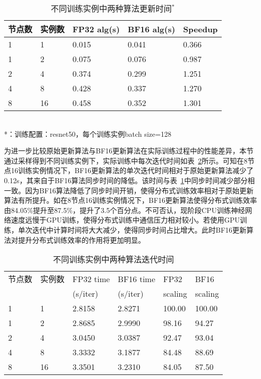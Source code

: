 \begin{table}[htbp]
  \centering
  \caption{不同训练实例中两种算法更新时间$^{*}$}
  \label{tab:fp32_bf16_real_update_time}
  \begin{minipage}[t]{0.8\textwidth} 
    \begin{tabularx}{\linewidth}{|l|X|X|X|X|}
      \hline
      节点数 & 实例数 & FP32 alg(s) & BF16 alg(s) & Speedup\\
      \hline
1 & 1 & 0.015 & 0.041 & 0.366 \\
1 & 2 & 0.075 & 0.076 & 0.987 \\
2 & 4 & 0.374 & 0.299 & 1.251 \\
4 & 8 & 0.428 & 0.337 & 1.270 \\
8 & 16 & 0.458 & 0.352 & 1.301 \\
      \hline
    \end{tabularx}\\[2pt]
    \footnotesize
    *：训练配置：resnet50，每个训练实例batch size=128\\
  \end{minipage}
\end{table}

为进一步比较原始更新算法与BF16更新算法在实际训练过程中的性能差异，本节通过采样得到不同训练实例下，实际训练中每次迭代时间如表~\ref{tab:fp32_bf16_real_iter_time}所示。可知在8节点16训练实例情况下，BF16更新算法的单次迭代时间相对于原始更新算法减少了0.12s，其来自于BF16算法同步时间的降低。该时间与表~\ref{tab:fp32_bf16_real_update_time}中同步时间减少部分相一致。因为BF16算法降低了同步时间开销，使得分布式训练效率相对于原始更新算法有所提升。如在8节点16训练实例情况下，BF16更新算法使得分布式训练效率由84.05\%提升至87.5\%，提升了3.5个百分点。不可否认，现阶段CPU训练神经网络速度远慢于GPU训练，使得分布式训练中通信压力相对较小。若使用GPU训练，单次迭代中计算时间将大大减少，使得同步时间占比增大。此时BF16更新算法对提升分布式训练效率的作用将更加明显。

\begin{table}[htbp]
  \centering
  \caption{不同训练实例中两种算法迭代时间}
  \label{tab:fp32_bf16_real_iter_time}
  \begin{minipage}[t]{0.8\textwidth} 
    \begin{tabularx}{\linewidth}{|l|X|X|X|X|X|}
      \hline
      节点数 & 实例数 & FP32 time & BF16 time & FP32 & BF16 \\
       &  & (s/iter) & (s/iter) & scaling & scaling\\
      \hline
1 & 1 & 2.8158 & 2.8271 & 100.00 & 100.00 \\
1 & 2 & 2.8685 & 2.9990 & 98.16 & 94.27 \\
2 & 4 & 3.0450 & 3.0387 & 92.47 & 93.04 \\
4 & 8 & 3.3332 & 3.1877 & 84.48 & 88.69 \\
8 & 16 & 3.3501 & 3.2310 & 84.05 & 87.50 \\
      \hline
    \end{tabularx}\\[2pt]
  \end{minipage}
\end{table}

